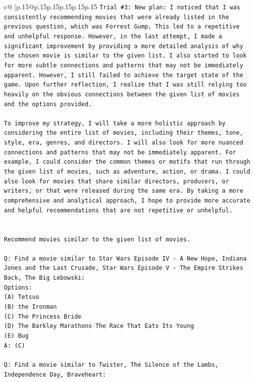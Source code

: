 \documentclass{article}
\begin{document}
{\begin{supertabular}{c@{$\;$}|p{.15\linewidth}@{}p{.15\linewidth}p{.15\linewidth}p{.15\linewidth}p{.15\linewidth}p{.15\linewidth}}
{{{\texttt{Trial \#3: New plan: I noticed that I was consistently recommending movies that were already listed in the previous question, which was Forrest Gump. This led to a repetitive and unhelpful response. However, in the last attempt, I made a significant improvement by providing a more detailed analysis of why the chosen movie is similar to the given list. I also started to look for more subtle connections and patterns that may not be immediately apparent. However, I still failed to achieve the target state of the game. Upon further reflection, I realize that I was still relying too heavily on the obvious connections between the given list of movies and the options provided. } \\
\\ 
\texttt{To improve my strategy, I will take a more holistic approach by considering the entire list of movies, including their themes, tone, style, era, genres, and directors. I will also look for more nuanced connections and patterns that may not be immediately apparent. For example, I could consider the common themes or motifs that run through the given list of movies, such as adventure, action, or drama. I could also look for movies that share similar directors, producers, or writers, or that were released during the same era. By taking a more comprehensive and analytical approach, I hope to provide more accurate and helpful recommendations that are not repetitive or unhelpful.} \\
\\ 
\\ 
\texttt{Recommend movies similar to the given list of movies.} \\
\\ 
\texttt{Q: Find a movie similar to Star Wars Episode IV {-} A New Hope, Indiana Jones and the Last Crusade, Star Wars Episode V {-} The Empire Strikes Back, The Big Lebowski:} \\
\texttt{Options:} \\
\texttt{(A) Tetsuo} \\
\texttt{(B) the Ironman} \\
\texttt{(C) The Princess Bride} \\
\texttt{(D) The Barkley Marathons The Race That Eats Its Young} \\
\texttt{(E) Bug} \\
\texttt{A: (C)} \\
\\ 
\texttt{Q: Find a movie similar to Twister, The Silence of the Lambs, Independence Day, Braveheart:} \\
}}}
\end{supertabular}}
\end{document}
